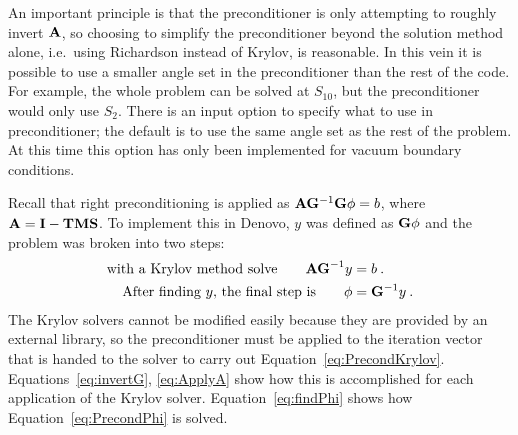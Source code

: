 An important principle is that the preconditioner is only attempting to roughly invert $\mathbf{A}$, so choosing to simplify the preconditioner beyond the solution method alone, i.e.\ using Richardson instead of Krylov, is reasonable. In this vein it is possible to use a smaller angle set in the preconditioner than the rest of the code. For example, the whole problem can be solved at $S_{10}$, but the preconditioner would only use $S_{2}$. There is an input option to specify what to use in preconditioner; the default is to use the same angle set as the rest of the problem. At this time this option has only been implemented for vacuum boundary conditions. 

Recall that right preconditioning is applied as $\mathbf{A} \mathbf{G}^{-1} \mathbf{G} \phi = b$, where $\mathbf{A} = \mathbf{I} - \mathbf{TMS}$. To implement this in Denovo, $y$ was defined as $\mathbf{G}\phi$ and the problem was broken into two steps: 
%
\begin{align}
  \text{with a Krylov method solve} \qquad \mathbf{AG}^{-1}y &= b \:. \label{eq:PrecondKrylov} \\
  \text{After finding }y\text{, the final step is} \qquad \phi &= \mathbf{G}^{-1}y \:. \label{eq:PrecondPhi}
\end{align}
%
The Krylov solvers cannot be modified easily because they are provided by an external library, so the preconditioner must be applied to the iteration vector that is handed to the solver to carry out Equation~\eqref{eq:PrecondKrylov}. Equations~\eqref{eq:invertG}, \eqref{eq:ApplyA} show how this is accomplished for each application of the Krylov solver. Equation~\eqref{eq:findPhi} shows how Equation~\ref{eq:PrecondPhi} is solved.  

